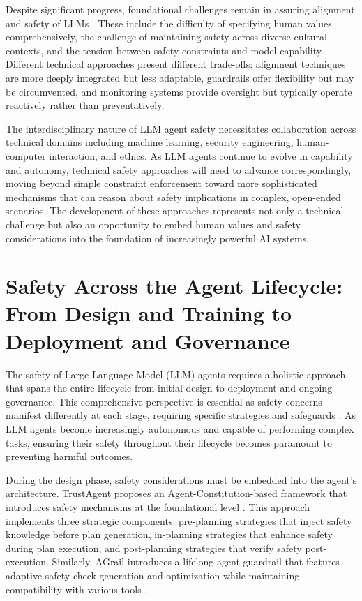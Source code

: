 \documentclass[conference]{IEEEtran}
\begin{document}
Despite significant progress, foundational challenges remain in assuring alignment and safety of LLMs \cite{2404.09932}. These include the difficulty of specifying human values comprehensively, the challenge of maintaining safety across diverse cultural contexts, and the tension between safety constraints and model capability. Different technical approaches present different trade-offs: alignment techniques are more deeply integrated but less adaptable, guardrails offer flexibility but may be circumvented, and monitoring systems provide oversight but typically operate reactively rather than preventatively.

The interdisciplinary nature of LLM agent safety necessitates collaboration across technical domains including machine learning, security engineering, human-computer interaction, and ethics. As LLM agents continue to evolve in capability and autonomy, technical safety approaches will need to advance correspondingly, moving beyond simple constraint enforcement toward more sophisticated mechanisms that can reason about safety implications in complex, open-ended scenarios. The development of these approaches represents not only a technical challenge but also an opportunity to embed human values and safety considerations into the foundation of increasingly powerful AI systems.



\section{Safety Across the Agent Lifecycle: From Design and Training to Deployment and Governance}

The safety of Large Language Model (LLM) agents requires a holistic approach that spans the entire lifecycle from initial design to deployment and ongoing governance. This comprehensive perspective is essential as safety concerns manifest differently at each stage, requiring specific strategies and safeguards \cite{2504.15585, 2412.17686}. As LLM agents become increasingly autonomous and capable of performing complex tasks, ensuring their safety throughout their lifecycle becomes paramount to preventing harmful outcomes.

During the design phase, safety considerations must be embedded into the agent's architecture. TrustAgent proposes an Agent-Constitution-based framework that introduces safety mechanisms at the foundational level \cite{2402.01586}. This approach implements three strategic components: pre-planning strategies that inject safety knowledge before plan generation, in-planning strategies that enhance safety during plan execution, and post-planning strategies that verify safety post-execution. Similarly, AGrail introduces a lifelong agent guardrail that features adaptive safety check generation and optimization while maintaining compatibility with various tools \cite{2502.11448}.
\end{document}
